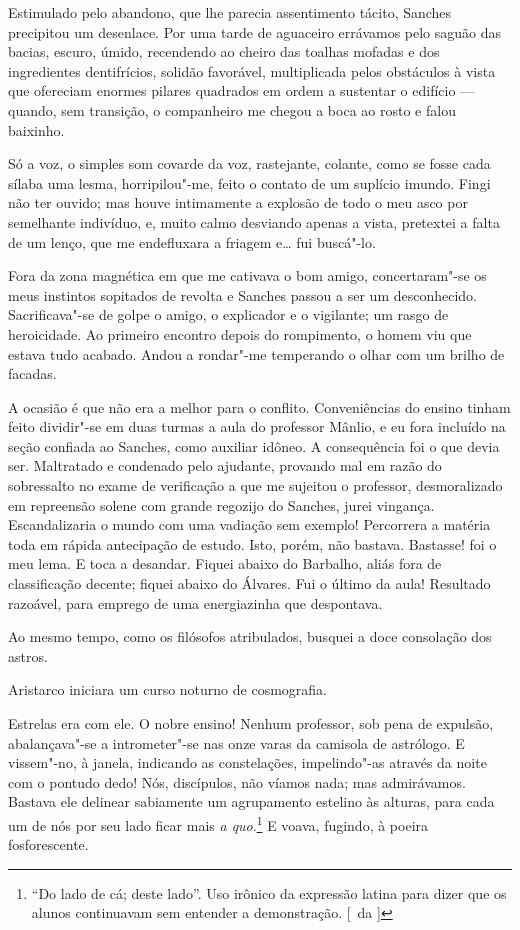 Estimulado pelo abandono, que lhe parecia
assentimento tácito, Sanches precipitou um desenlace. Por uma tarde de
aguaceiro errávamos pelo saguão das bacias, escuro, úmido, recendendo
ao cheiro das toalhas mofadas e dos ingredientes dentifrícios, solidão
favorável, multiplicada pelos obstáculos à vista que ofereciam enormes
pilares quadrados em ordem a sustentar o edifício --- quando, sem
transição, o companheiro me chegou a boca ao rosto e falou baixinho. 

Só a voz, o simples som covarde da voz, rastejante, colante, como se fosse
cada sílaba uma lesma, horripilou"-me, feito o contato de um suplício
imundo. Fingi não ter ouvido; mas houve intimamente a explosão de todo
o meu asco por semelhante indivíduo, e, muito calmo desviando apenas a
vista, pretextei a falta de um lenço, que me endefluxara a friagem e\ldots{}
fui buscá"-lo. 

Fora da zona magnética em que me cativava o bom amigo,
concertaram"-se os meus instintos sopitados de revolta e Sanches
passou a ser um desconhecido. Sacrificava"-se de golpe o amigo, o
explicador e o vigilante; um rasgo de heroicidade. Ao primeiro encontro
depois do rompimento, o homem viu que estava tudo acabado. Andou a
rondar"-me temperando o olhar com um brilho de facadas. 

A ocasião é que não era a melhor para o conflito. Conveniências do ensino tinham
feito dividir"-se em duas turmas a aula do professor Mânlio, e eu fora
incluído na seção confiada ao Sanches, como auxiliar idôneo. A
consequência foi o que devia ser. Maltratado e condenado pelo ajudante,
provando mal em razão do sobressalto no exame de verificação a que me
sujeitou o professor, desmoralizado em repreensão solene com grande
regozijo do Sanches, jurei vingança. Escandalizaria o mundo com uma
vadiação sem exemplo! Percorrera a matéria toda em rápida antecipação
de estudo. Isto, porém, não bastava. Bastasse! foi o meu lema. E toca a
desandar. Fiquei abaixo do Barbalho, aliás fora de classificação
decente; fiquei abaixo do Álvares. Fui o último da aula! Resultado
razoável, para emprego de uma energiazinha que despontava. 

Ao mesmo tempo, como os filósofos atribulados, 
busquei a doce consolação dos astros. 

Aristarco iniciara um curso noturno de cosmografia. 

Estrelas era com ele. O nobre ensino! Nenhum professor, sob pena de expulsão,
abalançava"-se a intrometer"-se nas onze varas da camisola de
astrólogo. E vissem"-no, à janela, indicando as constelações,
impelindo"-as através da noite com o pontudo dedo! Nós, discípulos,
não víamos nada; mas admirávamos. Bastava ele delinear sabiamente um
agrupamento estelino às alturas, para cada um de nós por seu lado ficar
mais \textit{a quo}.\footnote{ ``Do lado de cá; deste lado''. Uso irônico 
da expressão latina para dizer que os alunos continuavam sem entender 
a demonstração. [~da ]} E voava, fugindo, à poeira fosforescente. 

